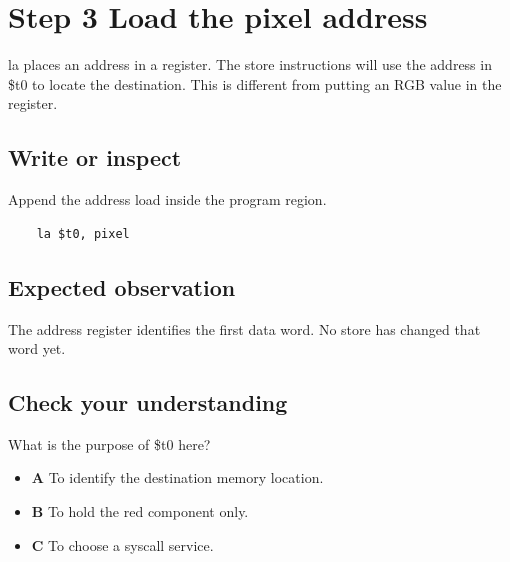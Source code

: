 \section{Step 3 Load the pixel
  address}\label{002-single-pixel-s03-step-3-load-the-pixel-address}

la places an address in a register. The store instructions will use the
address in \$t0 to locate the destination. This is different from
putting an RGB value in the register.

\subsection{Write or
  inspect}\label{002-single-pixel-s03-write-or-inspect}

Append the address load inside the program region.

\begin{verbatim}
    la $t0, pixel
\end{verbatim}

\subsection{Expected
  observation}\label{002-single-pixel-s03-expected-observation}

The address register identifies the first data word. No store has
changed that word yet.

\subsection{Check your
  understanding}\label{002-single-pixel-s03-check-your-understanding}

What is the purpose of \$t0 here?

\begin{itemize}
  \tightlist
  \item
        \textbf{A} To identify the destination memory location.
  \item
        \textbf{B} To hold the red component only.
  \item
        \textbf{C} To choose a syscall service.
\end{itemize}
